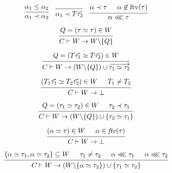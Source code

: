 \documentclass[12pt]{article}
\begin{document}
\pagestyle{empty}

\[
    \begin{prooftree}
        \hypo{\alpha_1 \leq \alpha_2}
        \infer1{\alpha_1 \prec \alpha_2}
    \end{prooftree}
    \hspace{1em}
    \begin{prooftree}
        \infer0{\alpha_1 \prec T \vec{\tau_2}}
    \end{prooftree}
    \hspace{1em}
    \begin{prooftree}
        \hypo{\alpha \prec \tau}
        \hypo{\alpha \not\in \mathrm{ftv}(\tau)}
        \infer2{\alpha \lll \tau}
    \end{prooftree}
\]

\[
    \begin{prooftree}
        \hypo{Q = (\tau \simeq \tau) \in W}
        \infer1{C \vdash W \to W \backslash \{Q\}}
    \end{prooftree}
\]

\[
    \begin{prooftree}
        \hypo{Q = (T \vec{\tau_1} \simeq T \vec{\tau_2}) \in W}
        \infer1{C \vdash W \to (W \backslash \{Q\}) \cup \overrightarrow{\tau_1 \simeq \tau_2}}
    \end{prooftree}
\]

\[
    \begin{prooftree}
        \hypo{(T_1 \vec{\tau_1} \simeq T_2 \vec{\tau_2}) \in W}
        \hypo{T_1 \neq T_2}
        \infer2{C \vdash W \to \bot}
    \end{prooftree}
\]

\[
    \begin{prooftree}
        \hypo{Q = (\tau_1 \simeq \tau_2) \in W}
        \hypo{\tau_2 \prec \tau_1}
        \infer2{C \vdash W \to (W \backslash \{Q\}) \cup \{\tau_2 \simeq \tau_1\}}
    \end{prooftree}
\]

\[
    \begin{prooftree}
        \hypo{(\alpha \simeq \tau) \in W}
        \hypo{\alpha \in \mathit{ftv}(\tau)}
        \infer2{C \vdash W \to \bot}
    \end{prooftree}
\]

\[
    \begin{prooftree}
        \hypo{\{\alpha \simeq \tau_1, \alpha \simeq \tau_2\} \subseteq W}
        \hypo{\tau_1 \neq \tau_2}
        \hypo{\alpha \lll \tau_1}
        \hypo{\alpha \lll \tau_2}
        \infer4{C \vdash W \to (W \backslash \{\alpha \simeq \tau_2\}) \cup \{\tau_1 \simeq \tau_2\}}
    \end{prooftree}
\]
\end{document}
